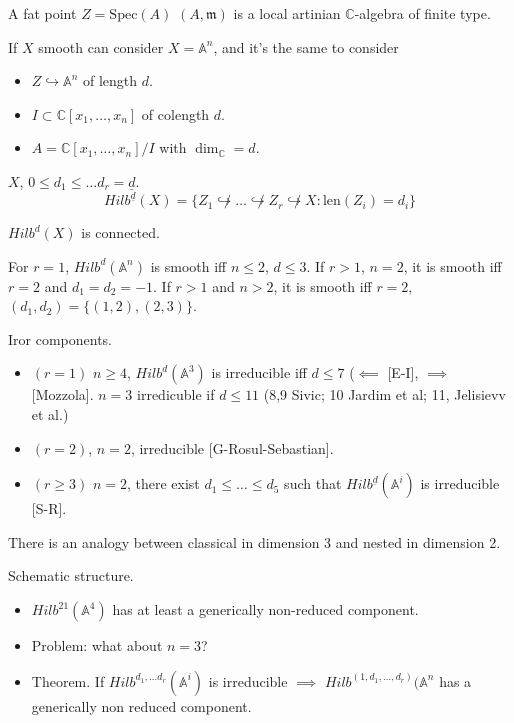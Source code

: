 A fat point $Z= \text{Spec}(A)$ $(A,
\mathfrak{m})$ is a
local artinian $\mathbb{C}$-algebra of finite
type.

If $X$ smooth can consider $X=\mathbb{A}^n$,
and it's the same to consider
\begin{itemize}
\item $Z \hookrightarrow \mathbb{A}^n$ of
length $d$.
\item $I \subset \mathbb{C}[x_1,\ldots,x_n]$
of
colength $d$.
\item $A= \mathbb{C}[x_1,\ldots,x_n]/I$ with
$\dim_\mathbb{C}=d$.
\end{itemize}

\begin{definition}
\label{definition-nested-Hilbert-scheme}
$X$, $0 \leq d_1 \leq \ldots
d_r=\underline{d}$.
$$
Hilb^{\underline{d}}(X)=
\{Z_1\not\hookrightarrow
\ldots
\not\hookrightarrow Z_r  \not\hookrightarrow
X:
\text{len}(Z_i)=d_i\}
$$
\end{definition}

\begin{theorem}[Hartshorne (r=0), Fogarty,
Kalpan (r>1)]
\label{theorem-HK}
$Hilb^d(X)$ is connected.
\end{theorem}

For $r=1$, $Hilb^d(\mathbb{A}^n)$ is smooth
iff
$n \leq 2$, $d \leq 3$.
If $r>1$, $n=2$, it is smooth iff $r=2$ and
$d_1=d_2=-1$.
If $r>1$ and $n>2$, it is smooth iff $r=2$,
$(d_1,d_2)=\{(1,2),(2,3)\}$.

Iror components.
\begin{itemize}
\item $(r=1)$ $n\geq 4$,
$Hilb^d(\mathbb{A}^3)$
is irreducible iff $d\leq 7$ ($\impliedby$
[E-I], $\implies $ [Mozzola].
$n=3$ irredicuble if $d \leq  11$ (8,9 Sivic;
10 Jardim et al; 11, Jelisievv et
al.)
\item $(r=2)$, $n=2$, irreducible
[G-Rosul-Sebastian].
\item $(r \geq 3)$ $n=2$, there exist $d_1
\leq \ldots \leq d_5$
such that
$Hilb^{\underline{d}}(\mathbb{A}^i)$ is
irreducible [S-R].
\end{itemize}

There is an analogy between classical in
dimension 3
and nested in dimension 2.

Schematic structure.
\begin{itemize}
\item [I] $Hilb^{21}(\mathbb{A}^4)$ has at
least a generically
non-reduced component.
\item Problem: what about $n=3$?
\item Theorem. If $Hilb^{d_1,\ldots
d_r}(\mathbb{A}^i)$ is
irreducible $\implies $
$Hilb^{(1,d_1,\ldots,d_r)}(\mathbb{A}^n$
has a generically non reduced component.
\end{itemize}

